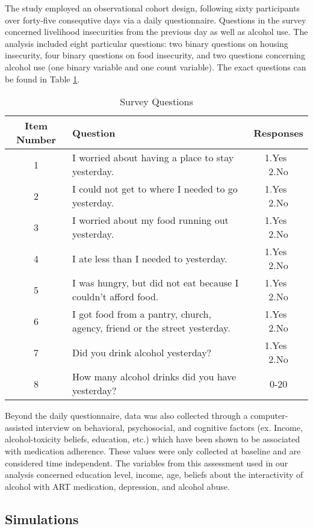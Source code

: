 \documentclass{svjour3}                     %
\begin{document}
The study employed an observational cohort design, following sixty participants over forty-five consequtive days via a daily questionnaire. Questions in the survey concerned livelihood insecurities from the previous day as well as alcohol use. The analysis included eight particular questions: two binary questions on housing insecurity, four binary questions on food insecurity, and two questions concerning alcohol use (one binary variable and one count variable). The exact questions can be found in Table \ref{tab:table1}. \par
\begin{table}[t]
	\centering
	\caption{Survey Questions}
	\label{tab:table1}
	\begin{tabular}{cp{6.5cm}c}
		\toprule
		Item Number & Question & Responses\\
		\midrule
		1 & I worried about having a place to stay yesterday. & 1.Yes $\>$ 2.No \\
		2 & I could not get to where I needed to go yesterday. & 1.Yes $\>$ 2.No \\
		3 & I worried about my food running out yesterday. & 1.Yes $\>$ 2.No \\
		4 & I ate less than I needed to yesterday. & 1.Yes $\>$ 2.No \\
		5 & I was hungry, but did not eat because I couldn't afford food. & 1.Yes $\>$ 2.No \\
		6 & I got food from a pantry, church, agency, friend or the street yesterday. & 1.Yes $\>$ 2.No \\
		7 & Did you drink alcohol yesterday? & 1.Yes $\>$ 2.No \\
		8 & How many alcohol drinks did you have yesterday? & 0-20 \\
		\bottomrule
	\end{tabular}
\end{table}

Beyond the daily questionnaire, data was also collected through a computer-assisted interview on behavioral, psychosocial, and cognitive factors (ex. Income, alcohol-toxicity beliefs, education, etc.) which have been shown to be associated with medication adherence. These values were only collected at baseline and are considered time independent. The variables from this assessment used in our analysis concerned education level, income, age, beliefs about the interactivity of alcohol with ART medication, depression, and alcohol abuse. \par

\subsection{Simulations}
\label{sec:2.2}
\end{document}
